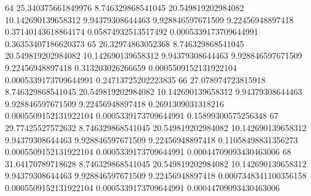 {64 25.340375661849976 8.746329868541045 20.549819202984082 10.142690139658312 9.94379308644463 9.928846597671509 9.22456948897418 0.37140143618864174 0.05874932513517492 0.0005339173709644991 0.36353407186620373
65 26.32974863052368 8.746329868541045 20.549819202984082 10.142690139658312 9.94379308644463 9.928846597671509 9.22456948897418 0.313203026266659 0.0005509152131922104 0.0005339173709644991 0.24713725202223835
66 27.078974723815918 8.746329868541045 20.549819202984082 10.142690139658312 9.94379308644463 9.928846597671509 9.22456948897418 0.2691309031318216 0.0005509152131922104 0.0005339173709644991 0.15899300575256348
67 29.77425527572632 8.746329868541045 20.549819202984082 10.142690139658312 9.94379308644463 9.928846597671509 9.22456948897418 0.11058498831356273 0.0005509152131922104 0.0005339173709644991 0.00044709093430463006
68 31.64170789718628 8.746329868541045 20.549819202984082 10.142690139658312 9.94379308644463 9.928846597671509 9.22456948897418 0.0007348341100356158 0.0005509152131922104 0.0005339173709644991 0.00044709093430463006
}\tableexpivwaittwittnet
